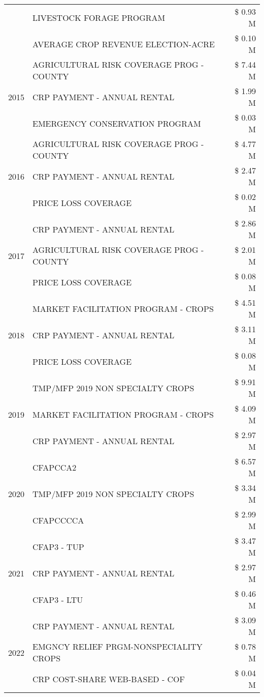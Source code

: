 \begin{tabular}{llr}
 & LIVESTOCK FORAGE PROGRAM & \$ 0.93 M \\
 & AVERAGE CROP REVENUE ELECTION-ACRE & \$ 0.10 M \\
\cline{1-3}
\multirow[t]{3}{*}{2015} & AGRICULTURAL RISK COVERAGE PROG - COUNTY & \$ 7.44 M \\
 & CRP PAYMENT - ANNUAL RENTAL & \$ 1.99 M \\
 & EMERGENCY CONSERVATION PROGRAM & \$ 0.03 M \\
\cline{1-3}
\multirow[t]{3}{*}{2016} & AGRICULTURAL RISK COVERAGE PROG - COUNTY & \$ 4.77 M \\
 & CRP PAYMENT - ANNUAL RENTAL & \$ 2.47 M \\
 & PRICE LOSS COVERAGE & \$ 0.02 M \\
\cline{1-3}
\multirow[t]{3}{*}{2017} & CRP PAYMENT - ANNUAL RENTAL & \$ 2.86 M \\
 & AGRICULTURAL RISK COVERAGE PROG - COUNTY & \$ 2.01 M \\
 & PRICE LOSS COVERAGE & \$ 0.08 M \\
\cline{1-3}
\multirow[t]{3}{*}{2018} & MARKET FACILITATION PROGRAM - CROPS & \$ 4.51 M \\
 & CRP PAYMENT - ANNUAL RENTAL & \$ 3.11 M \\
 & PRICE LOSS COVERAGE & \$ 0.08 M \\
\cline{1-3}
\multirow[t]{3}{*}{2019} & TMP/MFP 2019 NON SPECIALTY CROPS & \$ 9.91 M \\
 & MARKET FACILITATION PROGRAM - CROPS & \$ 4.09 M \\
 & CRP PAYMENT - ANNUAL RENTAL & \$ 2.97 M \\
\cline{1-3}
\multirow[t]{3}{*}{2020} & CFAPCCA2 & \$ 6.57 M \\
 & TMP/MFP 2019 NON SPECIALTY CROPS & \$ 3.34 M \\
 & CFAPCCCCA & \$ 2.99 M \\
\cline{1-3}
\multirow[t]{3}{*}{2021} & CFAP3 - TUP & \$ 3.47 M \\
 & CRP PAYMENT - ANNUAL RENTAL & \$ 2.97 M \\
 & CFAP3 - LTU & \$ 0.46 M \\
\cline{1-3}
\multirow[t]{3}{*}{2022} & CRP PAYMENT - ANNUAL RENTAL & \$ 3.09 M \\
 & EMGNCY RELIEF PRGM-NONSPECIALITY CROPS & \$ 0.78 M \\
 & CRP COST-SHARE WEB-BASED - COF & \$ 0.04 M \\
\cline{1-3}
\bottomrule
\end{tabular}
